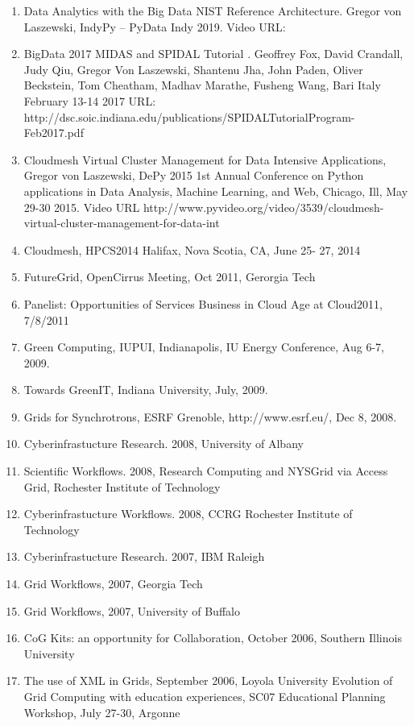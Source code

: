 \documentclass{article}
\renewcommand{\url}[1]{\href{#1}{\faExternalLink}}
\begin{document}
\begin{enumerate}
\item  Data Analytics with the Big Data NIST Reference Architecture. Gregor von Laszewski, IndyPy – PyData Indy 2019. Video URL: \url{https://www.youtube.com/watch?v=-wSurPTxuXg&list=PLt4L3V8wVnF58ZFkBQur3vSWrliVI3WAr&index=6&t=0s}
\item  BigData 2017 MIDAS and SPIDAL Tutorial . Geoffrey Fox, David Crandall, Judy Qiu, Gregor Von Laszewski, Shantenu Jha, John Paden, Oliver Beckstein, Tom Cheatham, Madhav Marathe, Fusheng Wang, Bari Italy February 13-14 2017
URL: http://dsc.soic.indiana.edu/publications/SPIDALTutorialProgram-Feb2017.pdf
\item  Cloudmesh Virtual Cluster Management for Data Intensive Applications, Gregor von Laszewski, DePy 2015 1st Annual Conference on Python applications in Data Analysis, Machine Learning, and Web, Chicago, Ill, May 29-30 2015. Video URL http://www.pyvideo.org/video/3539/cloudmesh-virtual-cluster-management-for-data-int
\item  Cloudmesh, HPCS2014 Halifax, Nova Scotia, CA, June 25- 27, 2014
\item  FutureGrid, OpenCirrus Meeting, Oct 2011, Gerorgia Tech
\item  Panelist: Opportunities of Services Business in Cloud Age at Cloud2011, 7/8/2011 
\item  Green Computing,  IUPUI, Indianapolis, IU Energy Conference, Aug 6-7, 2009.
\item  Towards GreenIT, Indiana University, July, 2009. 
\item  Grids for Synchrotrons, ESRF Grenoble, http://www.esrf.eu/, Dec 8, 2008. 
\item  Cyberinfrastucture Research. 2008, University of Albany 
\item  Scientific Workflows. 2008, Research Computing and NYSGrid via Access Grid, Rochester Institute of Technology 
\item  Cyberinfrastucture Workflows. 2008, CCRG Rochester Institute of Technology 
\item  Cyberinfrastucture Research. 2007, IBM Raleigh 
\item  Grid Workflows, 2007, Georgia Tech
\item  Grid Workflows, 2007, University of Buffalo
\item  CoG Kits: an opportunity for Collaboration, October 2006, Southern Illinois University  
\item  The use of XML in Grids, September 2006, Loyola University Evolution of Grid Computing with education experiences, SC07 Educational Planning Workshop, July  27-30, Argonne 

\end{enumerate}
\end{document}
